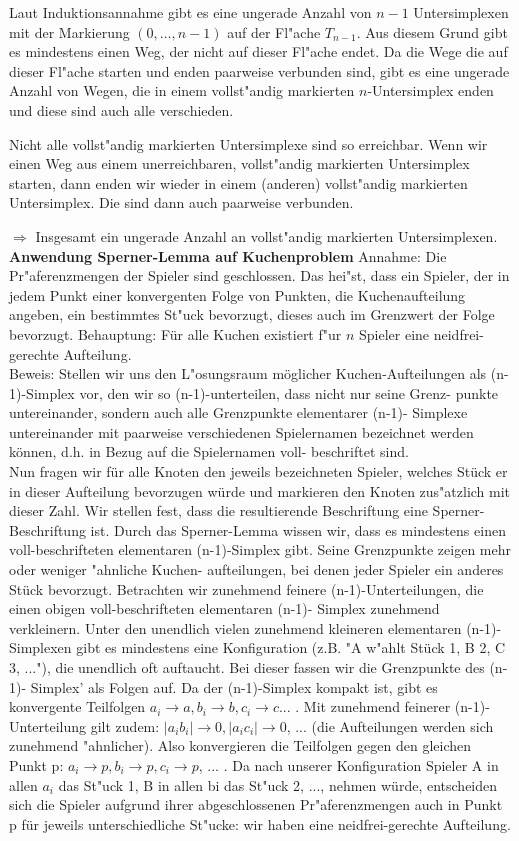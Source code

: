 \documentclass[11pt, a4paper, twoside]{article}
\numberwithin{equation}{section}
\begin{document}
Laut Induktionsannahme gibt es eine ungerade Anzahl von $n-1$ Untersimplexen mit der Markierung $(0, \ldots,n-1)$ auf der Fl"ache $T_{n-1}$.
Aus diesem Grund gibt es mindestens einen Weg, der nicht auf dieser Fl"ache endet.
Da die Wege die auf dieser Fl"ache starten und enden paarweise verbunden sind, gibt es eine ungerade Anzahl von Wegen, die in einem vollst"andig markierten $n$-Untersimplex enden und diese sind auch alle verschieden.

Nicht alle vollst"andig markierten Untersimplexe sind so erreichbar.
Wenn wir einen Weg aus einem unerreichbaren, vollst"andig markierten Untersimplex starten, dann enden wir wieder in einem (anderen) vollst"andig markierten Untersimplex.
Die sind dann auch paarweise verbunden.

$\Rightarrow$ Insgesamt ein ungerade Anzahl an vollst"andig markierten Untersimplexen.
\\
\textbf{Anwendung Sperner-Lemma auf Kuchenproblem}
Annahme: Die Pr"aferenzmengen der Spieler sind geschlossen. Das hei"st, dass ein Spieler, der in jedem Punkt einer konvergenten Folge von Punkten, die Kuchenaufteilung angeben, ein bestimmtes St"uck 
bevorzugt, dieses auch im Grenzwert der Folge bevorzugt.
Behauptung: Für alle Kuchen existiert f"ur $n$ Spieler eine neidfrei-gerechte Aufteilung.\\
Beweis: Stellen wir uns den L"osungsraum möglicher Kuchen-Aufteilungen als 
(n-1)-Simplex vor, den wir so (n-1)-unterteilen, dass nicht nur seine Grenz-
punkte untereinander, sondern auch alle Grenzpunkte elementarer (n-1)-
Simplexe untereinander mit paarweise verschiedenen Spielernamen 
bezeichnet werden können, d.h. in Bezug auf die Spielernamen voll-
beschriftet sind.\\
Nun fragen wir für alle Knoten den jeweils bezeichneten Spieler, 
welches Stück er in dieser Aufteilung bevorzugen würde und
markieren den Knoten zus"atzlich mit dieser Zahl. Wir stellen fest, 
dass die resultierende Beschriftung eine Sperner-Beschriftung ist.
Durch das Sperner-Lemma wissen wir, dass es mindestens einen 
voll-beschrifteten elementaren (n-1)-Simplex gibt. Seine 
Grenzpunkte zeigen mehr oder weniger "ahnliche Kuchen-
aufteilungen, bei denen jeder Spieler ein anderes Stück 
bevorzugt.
Betrachten wir zunehmend feinere (n-1)-Unterteilungen, 
die einen obigen voll-beschrifteten elementaren (n-1)-
Simplex zunehmend verkleinern. Unter den unendlich 
vielen zunehmend kleineren elementaren (n-1)-Simplexen gibt es mindestens eine Konfiguration (z.B. "A w"ahlt Stück 1, B 2, C 3, ..."), die unendlich oft auftaucht. Bei dieser fassen wir die Grenzpunkte des (n-1)-
Simplex' als Folgen auf. Da der (n-1)-Simplex kompakt ist, gibt es konvergente Teilfolgen $a_i \to a, b_i \to b, c_i \to c$... . Mit zunehmend feinerer (n-1)-Unterteilung gilt zudem: $|a_ib_i| \to 0, |a_ic_i| 
\to 0$, ... (die Aufteilungen werden sich zunehmend "ahnlicher). Also konvergieren die Teilfolgen gegen den 
gleichen Punkt p: $a_i \to p, b_i \to p, c_i \to p$, ... . Da nach unserer Konfiguration Spieler A in allen $a_i$ das St"uck 1, B in allen bi das St"uck 2, ..., nehmen würde, entscheiden sich die Spieler aufgrund ihrer abgeschlossenen Pr"aferenzmengen auch in Punkt p für jeweils unterschiedliche St"ucke: wir haben eine neidfrei-gerechte 
Aufteilung. 
\newpage
\end{document}
